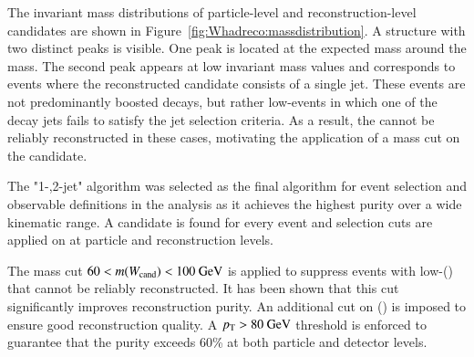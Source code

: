 The invariant mass distributions of particle-level and reconstruction-level \Wboson candidates are shown in Figure~\ref{fig:Whadreco:massdistribution}.
A structure with two distinct peaks is visible.
One peak is located at the expected mass around the \Wboson mass.
The second peak appears at low invariant mass values and corresponds to events where the reconstructed \Wboson candidate consists of a single jet.
These events are not predominantly boosted \Wboson decays, but rather low-\pt \Wboson events in which one 
of the decay jets fails to satisfy the jet selection criteria.
As a result, the \Wboson cannot be reliably reconstructed in these cases,
motivating the application of a mass cut on the \Wboson candidate.

The "1-,2-jet" algorithm was selected as the final algorithm for event selection and observable definitions in the analysis
as it achieves the highest purity over a wide kinematic range.
A \Wboson candidate is found for every event and
selection cuts are applied on \Wcand at particle and reconstruction levels.

The mass cut $60 < m(W_\mathrm{cand}) < 100~\text{GeV}$
is applied to suppress events with low-\pt(\Wboson) that cannot be reliably reconstructed. It has been shown that 
this cut significantly improves reconstruction purity. An additional cut on \pT(\Whad)
is imposed to ensure good reconstruction quality. A $p_{\text{T}} > 80~\text{GeV}$ threshold is enforced to guarantee that 
the purity exceeds 60\% at both particle and detector levels.
